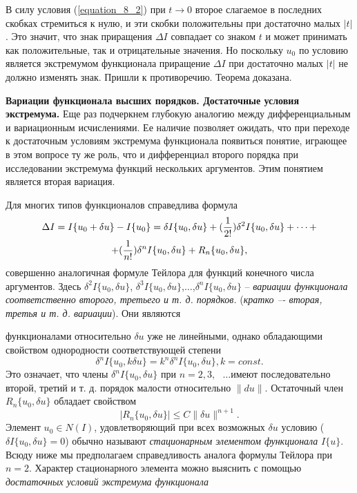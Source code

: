 	В силу условия (\ref{equation_8_2}) при $t\to 0$ второе слагаемое в последних скобках стремиться к нулю, и эти скобки положительны при достаточно малых $|t|$. Это значит, что знак приращения $\Delta I$ совпадает со знаком $t$ и может принимать как положительные, так и отрицательные значения. Но поскольку $u_0$ по условию является экстремумом функционала приращение $\Delta I$ при достаточно малых $|t|$ не должно изменять знак. Пришли к противоречию. Теорема доказана.

	{\bf Вариации функционала высших порядков. Достаточные условия экстремума.} Еще раз подчеркнем глубокую аналогию между дифференциальным и вариационным исчислениями. Ее наличие позволяет ожидать, что при переходе к достаточным условиям экстремума функционала появиться понятие, играющее в этом вопросе ту же роль, что и дифференциал второго порядка при исследовании экстремума функций нескольких аргументов. Этим понятием является вторая вариация.

	Для многих типов функционалов справедлива формула
	\begin{gather}
		\Delta I=I\{u_0+\delta u\}-I\{u_0\}=\delta I\{u_0,\delta u\}+(\frac{1}{2!})\delta^2 I\{u_0,\delta u\}+\dots+\notag\\
		+(\frac{1}{n!})\delta^n I\{u_0,\delta u\}+R_n\{u_0,\delta u\}\text{,}\notag
	\end{gather}
	совершенно аналогичная формуле Тейлора для функций конечного числа аргументов. Здесь $\delta^2 I\{u_0,\delta u\}$, $\delta^3 I\{u_0,\delta u\}$,$\dots$,$\delta^n I\{u_0, \delta u\}$ -- {\it вариации функционала соответственно второго, третьего и т. д. порядков.} ({\it кратко –- вторая, третья и т. д. вариации}). Они являются

	\newpage
	\noindent
	функционалами относительно $\delta u$ уже не линейными, однако обладающими свойством однородности соответствующей степени
	$$\delta^n I\{u_0, k\delta u\}=k^n \delta^n I\{u_0, \delta u\}, k=const.$$
	Это означает, что члены $\delta^n I\{u_0, \delta u\}$ при $n=2, 3,\text{ } \dots$имеют последовательно второй, третий и т. д. порядок малости относительно $\|du\|$. Остаточный член $R_n\{u_0,\delta u\}$ обладает свойством
	\begin{equation}
		\label{equation_8_3}
		|R_n\{u_0, \delta u\}|\le C\|\delta u\|^{n+1}\text{.}
	\end{equation}
	Элемент $u_0\in N(I)$, удовлетворяющий при всех возможных $\delta u$ условию ($\delta I\{u_0,\delta u\}=0$) обычно называют {\it стационарным элементом функционала} $I\{u\}$. Всюду ниже мы предполагаем справедливость аналога формулы Тейлора при $n=2$. Характер стационарного элемента можно выяснить с помощью {\it достаточных условий экстремума функционала}

